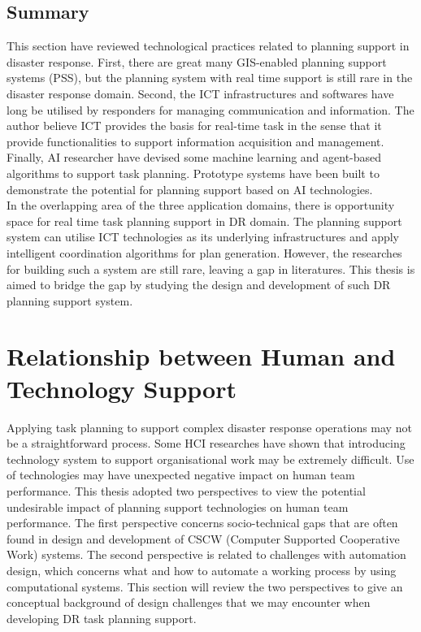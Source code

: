 \subsection{Summary}
This section have reviewed technological practices related to planning support in disaster response. First, there are great many GIS-enabled planning support systems (PSS), but the planning system with real time support is still rare in the disaster response domain. Second, the ICT infrastructures and softwares have long be utilised by responders for managing communication and information. The author believe ICT provides the basis for real-time task in the sense that it provide functionalities to support information acquisition and management. Finally, AI researcher have devised some machine learning and agent-based algorithms to support task planning. Prototype systems have been built to demonstrate the potential for planning support based on AI technologies.\\ 

In the overlapping area of the three application domains, there is opportunity space for real time task planning support in DR domain. The planning support system can utilise ICT technologies as its underlying infrastructures and apply intelligent coordination algorithms for plan generation. However, the researches for building such a system are still rare, leaving a gap in literatures. This thesis is aimed to bridge the gap by studying the design and development of such DR planning support system.\\

\section{Relationship between Human and Technology Support}\label{sec:LRSocialTechnical}
Applying task planning to support complex disaster response operations may not be a straightforward process. Some HCI researches \cite{Ackerman2000,Bowers1994,Niazkhani2009} have shown that introducing technology system to support organisational work may be extremely difficult. Use of technologies may have unexpected negative impact on human team performance. This thesis adopted two perspectives to view the potential undesirable impact of planning support technologies on human team performance. The first perspective concerns socio-technical gaps that are often found in design and development of CSCW (Computer Supported Cooperative Work) systems. The second perspective is related to challenges with automation design, which concerns what and how to automate a working process by using computational systems. This section will review the two perspectives to give an conceptual background of design challenges that we may encounter when developing DR task planning support.\\


